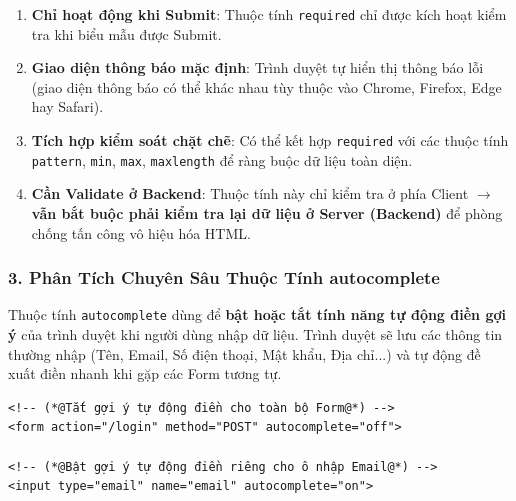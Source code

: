 \documentclass[11pt,oneside]{book}
\newcommand{\codeinline}[1]{\textcolor{accentOrange}{\texttt{#1}}}
\begin{document}
\begin{warnBox}
\begin{enumerate}[leftmargin=1.5em, itemsep=4pt, parsep=0pt]
    \item \textbf{Chỉ hoạt động khi Submit}: Thuộc tính \codeinline{required} chỉ được kích hoạt kiểm tra khi biểu mẫu được Submit.
    \item \textbf{Giao diện thông báo mặc định}: Trình duyệt tự hiển thị thông báo lỗi (giao diện thông báo có thể khác nhau tùy thuộc vào Chrome, Firefox, Edge hay Safari).
    \item \textbf{Tích hợp kiểm soát chặt chẽ}: Có thể kết hợp \codeinline{required} với các thuộc tính \codeinline{pattern}, \codeinline{min}, \codeinline{max}, \codeinline{maxlength} để ràng buộc dữ liệu toàn diện.
    \item \textbf{Cần Validate ở Backend}: Thuộc tính này chỉ kiểm tra ở phía Client $\rightarrow$ \textbf{vẫn bắt buộc phải kiểm tra lại dữ liệu ở Server (Backend)} để phòng chống tấn công vô hiệu hóa HTML.
\end{enumerate}
\end{warnBox}

\subsubsection{3. Phân Tích Chuyên Sâu Thuộc Tính autocomplete}

\begin{conceptBox}
Thuộc tính \codeinline{autocomplete} dùng để \textbf{bật hoặc tắt tính năng tự động điền gợi ý} của trình duyệt khi người dùng nhập dữ liệu. Trình duyệt sẽ lưu các thông tin thường nhập (Tên, Email, Số điện thoại, Mật khẩu, Địa chỉ...) và tự động đề xuất điền nhanh khi gặp các Form tương tự.
\end{conceptBox}

\begin{codeWindow}
\begin{lstlisting}[language=HTML5]
<!-- (*@Tắt gợi ý tự động điền cho toàn bộ Form@*) -->
<form action="/login" method="POST" autocomplete="off">

<!-- (*@Bật gợi ý tự động điền riêng cho ô nhập Email@*) -->
<input type="email" name="email" autocomplete="on">
\end{lstlisting}
\end{codeWindow}
\end{document}
